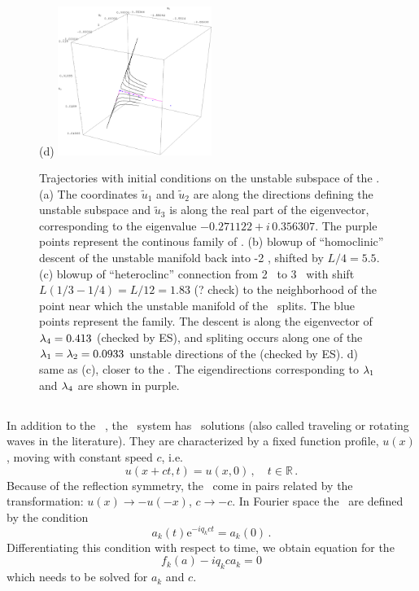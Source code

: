 \begin{figure}[h]
\hspace{0.1in}
(d)  \includegraphics[width=5.0cm]{figs/L22-2w-3w-detail.eps}
\caption{
 Trajectories with initial conditions on the unstable subspace of
 the  {\eqva}.
 (a) The coordinates $\tilde{u}_1$ and $\tilde{u}_2$ are along the directions defining the unstable subspace
 and $\tilde{u}_3$  is along the real part of the eigenvector,
 corresponding to the eigenvalue $-0.271122+ i\, 0.356307$. The purple points represent the continous family
 of
 \eqva.
(b) blowup of ``homoclinic'' descent of the unstable manifold
back into {\nameit}-2 {\eqv}, shifted by
$L/4 =5.5$.
(c) blowup of ``heteroclinc'' connection from
{\nameit}2 \eqv\ to {\nameit}3 \eqv\, with shift
$L(1/3-1/4) = L/12 = 1.83$ (? check)
to the neighborhood of the point near which the
unstable manifold of the
 \eqv\ splits. The blue points
represent the
 {\eqv} family.
The descent is along the eigenvector of $\lambda_4= 0.413$ (checked by ES),
and spliting
occurs along one of the
$\lambda_1=\lambda_2=0.0933$
unstable directions of the  {\eqv} (checked by ES).
d) same as (c), closer to the  {\eqv}. The eigendirections corresponding to $\lambda_1$
and $\lambda_4$ are shown in purple.
}
\label{f:neighborhood2w}
\end{figure}


\subsection{\Reqva}

In addition to the \eqva\ , the \KS\ system has \reqv\ solutions
(also called traveling or rotating waves in the literature).
They are characterized by a fixed function profile, $u(x)$,
moving with constant speed $c$, i.e.
\[ u(x+ct,t) = u(x, 0)\,,\quad t \in \mathbb{R}\,.\]
Because of the reflection symmetry, the \reqva\ come in pairs
related by the transformation: $u(x) \to -u(-x)$, $c \to -c$.
In Fourier space the \reqva\ are defined by the condition
\[ a_k(t)\mathrm{e}^{-iq_kct} = a_k(0)\,.\]
Differentiating this condition with respect to time, we obtain
equation for the \reqv\
\[ f_k(a) - i q_k c a_k = 0 \]
which needs to be solved for $a_k$ and $c$.

